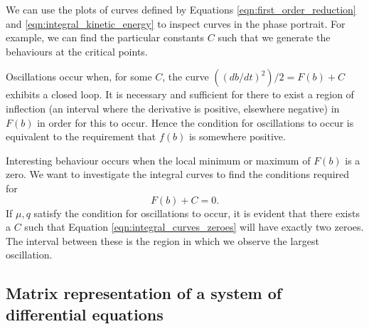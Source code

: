 \documentclass{article}
\begin{document}
We can use the plots of curves defined by Equations \ref{eqn:first_order_reduction} and \ref{eqn:integral_kinetic_energy} to inspect curves in the phase portrait.
For example, we can find the particular constants $C$ such that we generate the behaviours at the critical points.


Oscillations occur when, for some $C$, the curve $\left((db/dt)^2\right)/2 = F(b) + C$ exhibits a closed loop.
It is necessary and sufficient for there to exist a region of inflection (an interval where the derivative is positive,
elsewhere negative) in $F(b)$ in order for this to occur.
Hence the condition for oscillations to occur is equivalent to the requirement that $f(b)$ is somewhere positive.

Interesting behaviour occurs when the local minimum or maximum of $F(b)$ is a zero.
We want to investigate the integral curves to find the conditions required for
\begin{equation}
	F(b) + C = 0.
	\label{eqn:integral_curves_zeroes}
\end{equation}
If $\mu, q$ satisfy the condition for oscillations to occur,
it is evident that there exists a $C$ such that Equation \ref{eqn:integral_curves_zeroes} will have exactly two zeroes.
The interval between these is the region in which we observe the largest oscillation.

\subsection{Matrix representation of a system of differential equations}
\end{document}
